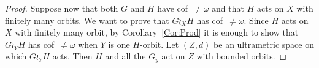 \documentclass[a4paper]{article}
\theoremstyle{definition}
\newcommand{\setst}[2]{\{#1\ |\ #2\}}
\begin{document}
\begin{proof}
Suppose now that both $G$ and $H$ have cof~$\neq\omega$ and that $H$ acts on $X$ with finitely many orbits. We want to prove that $G\wr_XH$ has cof~$\neq\omega$.
Since $H$ acts on $X$ with finitely many orbit, by Corollary~\ref{Cor:Prod} it is enough to show that $G\wr_YH$ has cof~$\neq\omega$ when $Y$ is one $H$-orbit.
%
%
%
%
Let $(Z,d)$ be an ultrametric space on which $G\wr_YH$ acts.
Then $H$ and all the $G_y$ act on $Z$ with bounded orbits.

\end{proof}
\end{document}
